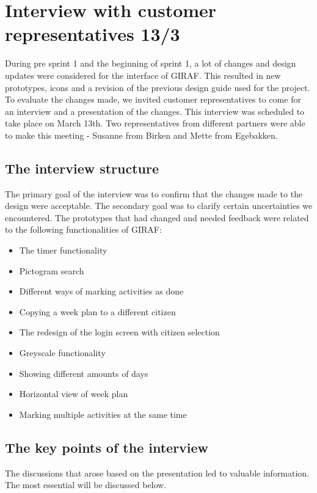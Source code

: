 \section{Interview with customer representatives 13/3}\label{interview13-3}
During pre sprint 1 and the beginning of sprint 1, a lot of changes and design updates were considered for the interface of GIRAF.
This resulted in new prototypes, icons and a revision of the previous design guide used for the project.
To evaluate the changes made, we invited customer representatives to come for an interview and a presentation of the changes.
This interview was scheduled to take place on March 13th.
Two representatives from different partners were able to make this meeting - Susanne from Birken and Mette from Egebakken.

\subsection{The interview structure}
The primary goal of the interview was to confirm that the changes made to the design were acceptable.
The secondary goal was to clarify certain uncertainties we encountered.
The prototypes that had changed and needed feedback were related to the following functionalities of GIRAF:
\begin{itemize}
    \item The timer functionality
    \item Pictogram search
    \item Different ways of marking activities as done
    \item Copying a week plan to a different citizen
    \item The redesign of the login screen with citizen selection
    \item Greyscale functionality
    \item Showing different amounts of days
    \item Horizontal view of week plan
    \item Marking multiple activities at the same time
\end{itemize}

\subsection{The key points of the interview}
The discussions that arose based on the presentation led to valuable information.
The most essential will be discussed below.

